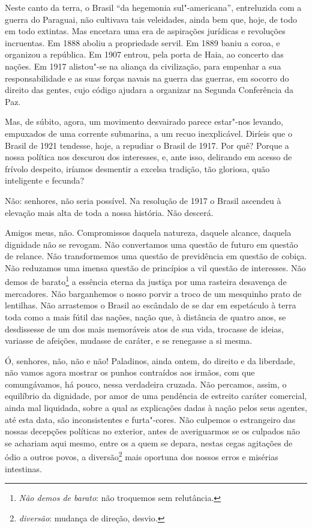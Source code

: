 Neste canto da terra, o Brasil ``da hegemonia
sul"-americana'', entreluzida com a guerra do Paraguai, não
cultivava tais veleidades, ainda bem que, hoje, de todo em todo
extintas. Mas encetara uma era de aspirações jurídicas e revoluções
incruentas. Em 1888 aboliu a propriedade servil. Em 1889 baniu a coroa, e organizou a
república. Em 1907 entrou, pela
porta de Haia, ao concerto das nações. Em 1917 alistou"-se na aliança da
civilização, para empenhar a sua responsabilidade e as suas forças
navais na guerra das guerras, em socorro do direito das gentes, cujo
código ajudara a organizar na Segunda Conferência da Paz.

Mas, de súbito, agora, um movimento desvairado parece estar"-nos
levando, empuxados de uma corrente submarina, a um recuo inexplicável.
Diríeis que o Brasil de 1921 tendesse, hoje, a repudiar o Brasil de
1917. Por quê? Porque a nossa política nos descurou dos interesses, e,
ante isso, delirando em acesso de frívolo despeito, iríamos desmentir a
excelsa tradição, tão gloriosa, quão inteligente e fecunda?

Não: senhores, não seria possível. Na resolução de 1917 o Brasil
ascendeu à elevação mais alta de toda a nossa história. Não descerá.

Amigos meus, não. Compromissos daquela natureza, daquele alcance,
daquela dignidade não se revogam. Não convertamos uma questão de futuro
em questão de relance. Não transformemos uma questão de previdência em
questão de cobiça. Não reduzamos uma imensa questão de princípios a vil
questão de interesses. Não demos de barato\footnote{\textit{Não demos de
barato}: não troquemos sem relutância.} a essência
eterna da justiça por uma rasteira desavença de mercadores. Não
barganhemos o nosso porvir a troco de um mesquinho prato de lentilhas.
Não arrastemos o Brasil ao escândalo de se dar em espetáculo à terra
toda como a mais fútil das nações, nação que, à distância de quatro
anos, se desdissesse de um dos mais memoráveis atos de sua vida,
trocasse de ideias, variasse de afeições, mudasse de caráter, e se
renegasse a si mesma.

Ó, senhores, não, não e não! Paladinos, ainda ontem, do direito e
da liberdade, não vamos agora mostrar os punhos contraídos aos irmãos,
com que comungávamos, há pouco, nessa verdadeira cruzada. Não percamos,
assim, o equilíbrio da dignidade, por amor de uma pendência de estreito
caráter comercial, ainda mal liquidada, sobre a qual as explicações
dadas à nação pelos seus agentes, até esta data, são inconsistentes e
furta"-cores. Não culpemos o estrangeiro das nossas decepções políticas
no exterior, antes de averiguarmos se os culpados não se achariam aqui
mesmo, entre os a quem se depara, nestas cegas agitações de ódio a
outros povos, a diversão\footnote{\textit{diversão}: mudança de direção, desvio.} mais oportuna dos nossos erros e misérias intestinas.

